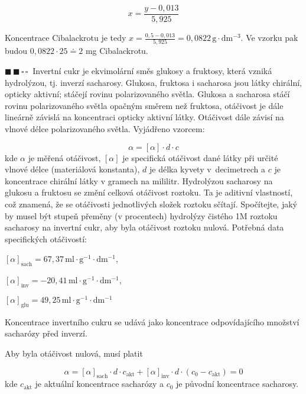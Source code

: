 \documentclass{book}
\newcommand{\dva}{$\blacksquare \, \blacksquare \, \square \, \square \; \; $}
\renewenvironment{quotation}{\par}{\par} %
\begin{document}
\[
x=\frac{y-0,013}{5,925}
\]

Koncentrace Cibalackrotu je tedy $x=\frac{0,5-0,013}{5,925}=0,0822\,\mathrm{g\cdot dm^{-3}}$.
Ve vzorku pak budou $0,0822\cdot25\doteq2$ mg Cibalackrotu.

\hrulefill %
\begin{quotation}
\dva Invertní cukr je ekvimolární směs glukosy a fruktosy, která vzniká
hydrolýzou, tj. inverzí sacharosy. Glukosa, fruktosa i sacharosa jsou
látky chirální, opticky aktivní; stáčejí rovinu polarizovaného světla.
Glukosa a sacharosa stáčí rovinu polarizovaného světla opačným směrem
než fruktosa, otáčivost je dále lineárně závislá na koncentraci opticky
aktivní látky. Otáčivost dále závisí na vlnové délce polarizovaného
světla. Vyjádřeno vzorcem: 

\[
\alpha=[\alpha]\cdot d\cdot c
\]
kde $\alpha$ je měřená otáčivost, $[\alpha]$ je specifická otáčivost
dané látky při určité vlnové délce (materiálová konstanta), $d$ je
délka kyvety v~decimetrech a $c$ je koncentrace chirální látky v
gramech na mililitr. Hydrolýzou sacharosy na glukosu a fruktosu se
změní celková otáčivost roztoku. Ta je aditivní vlastností, což znamená,
že se otáčivosti jednotlivých složek roztoku sčítají. Spočítejte,
jaký by musel být stupeň přeměny (v procentech) hydrolýzy čistého
1M roztoku sacharosy na invertní cukr, aby byla otáčivost roztoku
nulová. Potřebná data specifických otáčivostí: 

$[\alpha]_{\mathrm{sach}}=67,37\,\mathrm{ml\cdot g^{-1}\cdot dm^{-1}}$, 

$[\alpha]_{\mathrm{inv}}=-20,41\,\mathrm{ml\cdot g^{-1}\cdot dm^{-1}}$,

$[\alpha]_{\mathrm{glu}}=49,25\,\mathrm{ml\cdot g^{-1}\cdot dm^{-1}}$

Koncentrace invertního cukru se udává jako koncentrace odpovídajícího
množství sacharózy před inverzí.
\end{quotation} \dotfill \par 

\newpage %
Aby byla otáčivost nulová, musí platit

\[
\alpha=[\alpha]_{\mathrm{sach}}\cdot d\cdot c_{\mathrm{akt} }+[\alpha]_{\mathrm{inv}}\cdot d\cdot(c_{0}-c_{\mathrm{akt} })=0
\]
kde $c_{\mathrm{akt} }$ je aktuální koncentrace sacharózy a $c_{0}$ je původní
koncentrace sacharosy.
\end{document}
